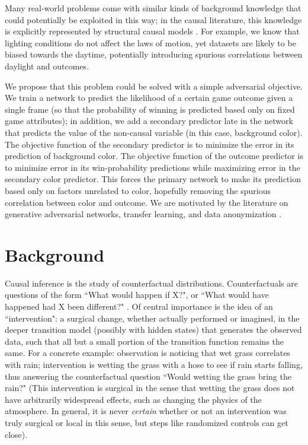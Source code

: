 \documentclass{article}
\begin{document}
Many real-world problems come with similar kinds of background knowledge that could potentially be exploited in this way; in the causal literature, this knowledge is explicitly represented by structural causal models \cite{Pearl2009} \cite{pearl2009causalitybook}. For example, we know that lighting conditions do not affect the laws of motion, yet datasets are likely to be biased towards the daytime, potentially introducing spurious correlations between daylight and outcomes. %

We propose that this problem could be solved with a simple adversarial objective. We train a network to predict the likelihood of a certain game outcome given a single frame (so that the probability of winning is predicted based only on fixed game attributes); in addition, we add a secondary predictor late in the network that predicts the value of the non-causal variable (in this case, background color). The objective function of the secondary predictor is to minimize the error in its prediction of background color. The objective function of the outcome predictor is to minimize error in its win-probability predictions while maximizing error in the secondary color predictor. This forces the primary network to make its prediction based only on factors unrelated to color, hopefully removing the spurious correlation between color and outcome. We are motivated by the literature on generative adversarial networks, transfer learning, and data anonymization 
\cite{feutry2018learning} \cite{hukkelaas2019deepprivacy} \cite{li2009modeling} %
\cite{tan2018survey} \cite{ganin2016domain} %
\cite{goodfellow2014generative} %
.


\section{Background}
Causal inference is the study of counterfactual distributions. Counterfactuals are questions of the form ``What would happen if X?", or ``What would have happened had X been different?" \cite{pearl2018theoretical}. Of central importance is the idea of an ``intervention": a surgical change, whether actually performed or imagined, in the deeper transition model (possibly with hidden states) that generates the observed data, such that all but a small portion of the transition function remains the same. For a concrete example: observation is noticing that wet grass correlates with rain; intervention is wetting the grass with a hose to see if rain starts falling, thus answering the counterfactual question ``Would wetting the grass bring the rain?" (This intervention is surgical in the sense that wetting the grass does not have arbitrarily widespread effects, such as changing the physics of the atmosphere. In general, it is never \emph{certain} whether or not an intervention was truly surgical or local in this sense, but steps like randomized controls can get close).
	
\end{document}
